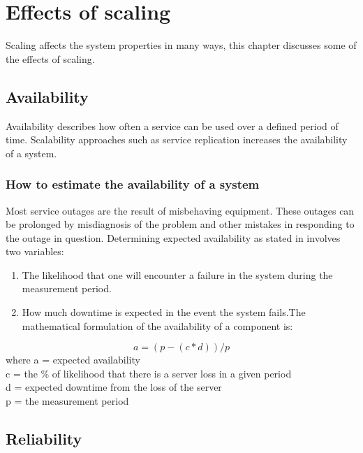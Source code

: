 \chapter{Effects of scaling}
\label{ch:Effects of scaling}


Scaling affects the system properties in many ways, this chapter discusses some of the effects of scaling.

\section{Availability}
Availability describes how often a service can be used over a defined period of time. Scalability approaches such as service replication increases the availability of a system.

\subsection{How to estimate the availability of a system}

Most service outages are the result of misbehaving equipment. These outages can be prolonged by misdiagnosis of the problem and other mistakes in responding to the outage in question. Determining expected availability as stated in \cite{reese_cloud_nodate} involves two variables:

\begin{enumerate}


	\item  The likelihood that one will encounter a failure in the system during the measurement period.

	\item  How much downtime is expected in the event the system fails.The mathematical formulation of the availability of a component is: 
\end{enumerate}
\begin{equation}
a = (p - (c*d))/p
\end{equation}
where a = expected availability\\
c = the \% of likelihood that there is a server loss in a given period\\
d = expected downtime from the loss of the server\\
p = the measurement period\\

\section{Reliability}

